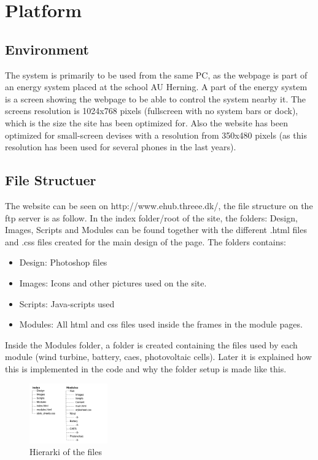 \newpage
\chapter{Platform}
\section{Environment}
The system is primarily to be used from the same PC, as the webpage is part of an energy system
placed at the school AU Herning. A part of the energy system is a screen showing the webpage to
be able to control the system nearby it. The screens resolution is 1024x768 pixels (fullscreen with no system bars or dock), 
which is the size the site has been optimized for. Also the website has been optimized for small-screen devises with a resolution from 350x480 pixels (as this resolution has been used for several phones in the last years).
\section{File Structuer}
The website can be seen on http://www.ehub.threee.dk/, the file structure on the ftp server is as follow. In the index folder/root of the site, the folders: Design, Images, Scripts and Modules can be found together with the different .html files and .css files created for the main design of the page. The folders contains:
\begin{itemize}
	\item Design: Photoshop files
	\item Images: Icons and other pictures used on the site.
	\item Scripts: Java-scripts used
	\item Modules: All html and css files used inside the frames in the module pages.
\end{itemize}
Inside the Modules folder, a folder is created containing the files used by each module (wind turbine, battery, caes, photovoltaic cells). Later it is explained how this is implemented in the code and why the folder setup is made like this.
\begin{figure}[htbp]
	\center
	\includegraphics[width=0.3\textwidth]{images/hierarki.png} %
   	\caption{Hierarki of the files}
   	\label{fig:file_hierarki}
\end{figure}

